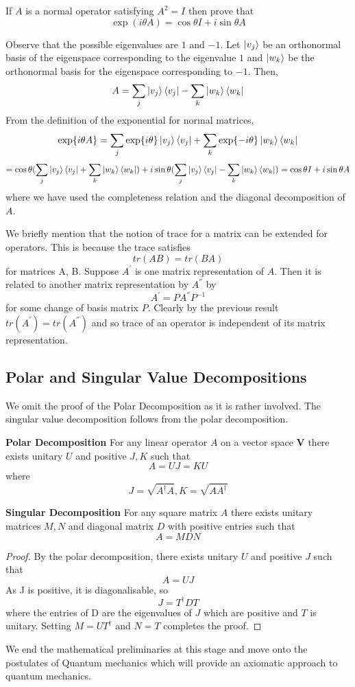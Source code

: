 \begin{exercise}
If $A$ is a normal operator satisfying $A^2 = I$ then prove that 
$$ \exp(i\theta A) = \cos{\theta}I + i\sin{\theta}A$$
\end{exercise}
\begin{solution}
Observe that the possible eigenvalues are $1$ and $-1$. Let $\ket{v_j}$ be an orthonormal basis of the eigenspace corresponding to the eigenvalue $1$ and $\ket{w_k}$ be the orthonormal basis for the eigenspace corresponding to $-1$. Then, 
$$ A = \sum_j \ket{v_j}\bra{v_j} - \sum_k \ket{w_k}\bra{w_k} $$
From the definition of the exponential for normal matrices,
$$\exp{i\theta A} = \sum_j \exp{i\theta }\ket{v_j}\bra{v_j} + \sum_k \exp{-i\theta}\ket{w_k}\bra{w_k}$$ 
$$ = \cos{\theta}(  \sum_j \ket{v_j}\bra{v_j} + \sum_k \ket{w_k}\bra{w_k}) + i\sin{\theta}( \sum_j \ket{v_j}\bra{v_j} - \sum_k \ket{w_k}\bra{w_k}) =  \cos{\theta}I + i\sin{\theta}A $$ where we have used the completeness relation and the diagonal decomposition of $A$.
\end{solution}
We briefly mention that the notion of trace for a matrix can be extended for operators. This is because the trace satisfies
$$ tr(AB) = tr(BA) $$ for matrices A, B.
Suppose $A^{'}$ is one matrix representation of $A$. Then it is related to another matrix representation by $A^{''}$ by 
$$A^{'} = PA^{''}P^{-1}$$ for some change of basis matrix $P$.
Clearly by the previous  result $tr(A^{'}) = tr(A^{''})$ and so trace of an operator is independent of its matrix representation.

\subsection{Polar and Singular Value Decompositions}
We omit the proof of the Polar Decomposition as it is rather involved. The singular value decomposition follows from the polar decomposition.
\begin{theorem} \textbf{Polar Decomposition}
For any linear operator $A$ on a vector space $\textbf{V}$ there exists unitary $U$ and positive $J, K$ such that
$$A = UJ = KU$$ where
$$J = \sqrt{A^\dagger A}, K = \sqrt{AA^\dagger}$$
\end{theorem}

\begin{theorem} \textbf{Singular Decomposition}
For any square matrix $A$ there exists unitary matrices $M, N$ and diagonal matrix $D$ with positive entries such that
$$A = MDN $$
\end{theorem}
\begin{proof}
By the polar decomposition, there exists unitary $U$ and positive $J$ such that 
$$ A = UJ $$
As J is positive, it is diagonalisable, so $$J = T^\dagger DT$$ where the entries of D are the eigenvalues of $J$ which are positive and $T$ is unitary.
Setting $M = UT^\dagger$ and $N = T$ completes the proof.
\end{proof}

We end the mathematical preliminaries at this stage and move onto the postulates of Quantum mechanics which will provide an axiomatic approach to quantum mechanics.
\clearpage
